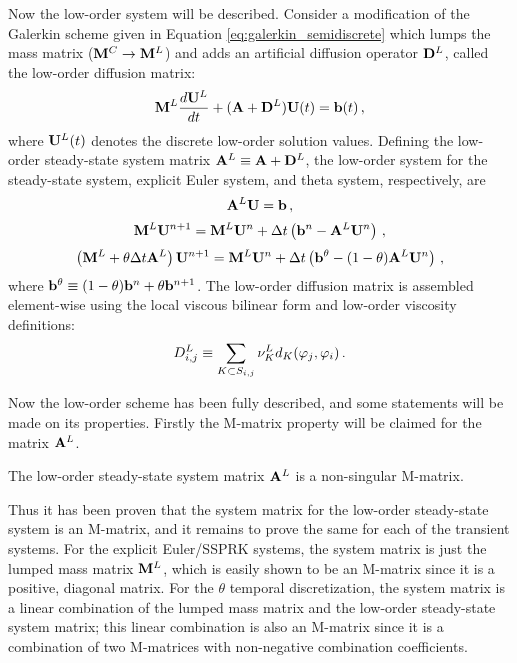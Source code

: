 Now the low-order system will be described.
Consider a modification of the Galerkin scheme given in Equation \eqref{eq:galerkin_semidiscrete}
which lumps the mass matrix ($\mathbf{M}^C \rightarrow \mathbf{M}^L$) and adds an artificial
diffusion operator $\mathbf{D}^L$, called the low-order diffusion matrix:
\begin{equation}
  \mathbf{M}^L\frac{d\mathbf{U}^L}{dt} + (\mathbf{A} + \mathbf{D}^L)\mathbf{U}(t) = \mathbf{b}(t) \,,
\end{equation}
where $\mathbf{U}^L(t)$ denotes the discrete low-order solution values.
Defining the low-order steady-state system matrix $\mathbf{A}^L\equiv\mathbf{A} + \mathbf{D}^L$,
the low-order system for the steady-state system, explicit Euler system,
and theta system, respectively, are
\begin{equation}\label{eq:low_ss}
  \mathbf{A}^L \mathbf{U} = \mathbf{b} \,,
\end{equation}
\begin{equation}\label{eq:low_fe}
  \mathbf{M}^L\mathbf{U}^{n+1} = \mathbf{M}^L\mathbf{U}^n + \Delta t\left(\mathbf{b}^n - \mathbf{A}^L\mathbf{U}^n\right) \,,
\end{equation}
\begin{equation}\label{eq:low_theta}
  \left(\mathbf{M}^L + \theta\Delta t\mathbf{A}^L\right)\mathbf{U}^{n+1} = \mathbf{M}^L\mathbf{U}^n + \Delta t\left(\mathbf{b}^\theta
    - (1-\theta)\mathbf{A}^L\mathbf{U}^n\right) \,,
\end{equation}
where $\mathbf{b}^\theta \equiv (1-\theta)\mathbf{b}^n + \theta\mathbf{b}^{n+1}$.
The low-order
diffusion matrix is assembled element-wise using the local viscous bilinear
form and low-order viscosity definitions:
\begin{equation}\label{eq:low_order_diffusion_matrix}
  D_{i,j}^L \equiv
    \sum\limits_{K\subset S_{i,j}}\nu^L_K
    d_K(\varphi_j,\varphi_i) \,.
\end{equation}

Now the low-order scheme has been fully described, and some statements will be
made on its properties. Firstly the M-matrix property will be claimed for
the matrix $\mathbf{A}^L$.
\begin{thm}
  The low-order steady-state system matrix $\mathbf{A}^L$ is a non-singular M-matrix.
\end{thm}

Thus it has been proven that the system matrix for the low-order steady-state
system is an M-matrix, and it remains to prove the same for each of the
transient systems. For the explicit Euler/SSPRK systems, the system matrix
is just the lumped mass matrix $\mathbf{M}^L$, which is easily shown to be an M-matrix
since it is a positive, diagonal matrix. For the $\theta$ temporal
discretization, the system matrix is a linear combination of the lumped mass
matrix and the low-order steady-state system matrix; this linear combination
is also an M-matrix since it is a combination of two M-matrices with non-negative
combination coefficients.

